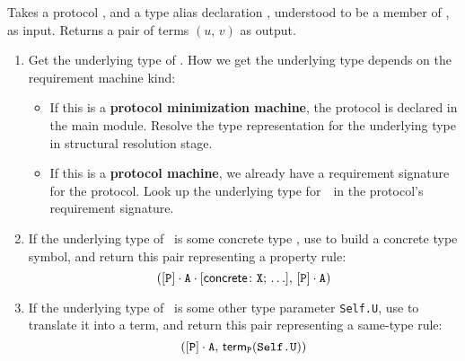 \documentclass[../generics]{subfiles}
\begin{document}
\begin{algorithm}\label{build rule alias}
Takes a protocol \tP, and a type alias declaration \nA, understood to be a member of \tP, as input. Returns a pair of terms $(u,\,v)$ as output.
\begin{enumerate}
\item Get the underlying type of \nA. How we get the underlying type depends on the requirement machine kind:
\begin{itemize}
\item If this is a \textbf{protocol minimization machine}, the protocol is declared in the main module. Resolve the type representation for the underlying type in structural resolution stage.

\item If this is a \textbf{protocol machine}, we already have a requirement signature for the protocol. Look up the underlying type for~\nA\ in the protocol's requirement signature.
\end{itemize}
\item If the underlying type of \nA\ is some concrete type \tX, use  to build a concrete type symbol, and return this pair representing a property rule:
\[([\texttt{P}] \cdot \texttt{A} \cdot [\mathsf{concrete}\colon \texttt{X};\,\ldots],\, [\texttt{P}] \cdot \texttt{A})\]
\item If the underlying type of \nA\ is some other type parameter \texttt{Self.U}, use  to translate it into a term, and return this pair representing a same-type rule:
\[([\texttt{P}] \cdot \texttt{A},\, \mathsf{term}_{\texttt{P}}(\texttt{Self.U}))\]
\end{enumerate}
\end{algorithm}

\newcommand{\pPair}{\protosym{Pair}}
\newcommand{\pGraph}{\protosym{Graph}}
\newcommand{\nEl}{\texttt{Elt}}
\newcommand{\nEd}{\texttt{Edge}}
\newcommand{\nV}{\texttt{Vertex}}
\newcommand{\nES}{\texttt{EdgeSet}}

\newcommand{\aEl}{\assocsym{Pair}{Elt}}
\newcommand{\aEd}{\assocsym{Graph}{Edge}}
\end{document}
